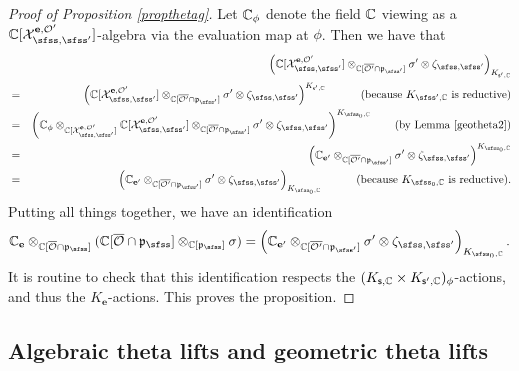 \documentclass[12pt,a4paper]{amsart}
\newcommand{\CO}{{\mathcal {O}}}
\newcommand{\CX}{{\mathcal {X}}}
\newcommand{\p}{\mathfrak p}
\numberwithin{equation}{section}
\theoremstyle{remark}
\begin{document}
\begin{proof}[Proof of Proposition \ref{propthetag}]
 Let $\mathbb{C}_\phi$ denote the field $\mathbb{C}$ viewing as a $\C[\CX_{\sfss, \sfss'}^{\mathbf e, \CO'}]$-algebra via the evaluation map at $\phi$. Then we have that
\begin{eqnarray*}
      &&\left( \C[\CX_{\sfss, \sfss'}^{\mathbf e, \CO'}] \otimes_{\C[\overline{\CO'}\cap \p_{\sfss'}]}\sigma'\otimes \zeta_{\sfss, \sfss'}\right)_{K_{\mathsf s', \C}}\\
             &=&\left( \C[\CX_{\sfss, \sfss'}^{\mathbf e, \CO'}] \otimes_{\C[\overline{\CO'}\cap \p_{\sfss'}]}\sigma'\otimes \zeta_{\sfss, \sfss'}\right)^{K_{\mathsf s', \C}}\quad \qquad (\textrm{because $K_{\sfss',\C}$ is reductive})\\
             &=&\left( \C_\phi\otimes_{\C[\CX_{\sfss, \sfss'}^{\mathbf e, \CO'}]} \C[\CX_{\sfss, \sfss'}^{\mathbf e, \CO'}] \otimes_{\C[\overline{\CO'}\cap \p_{\sfss'}]}\sigma'\otimes \zeta_{\sfss, \sfss'}\right)^{K_{\sfss_0,\C}} \qquad (\textrm{by Lemma \ref{geotheta2}})\\
               &=&\left( \C_{\mathbf e'}  \otimes_{\C[\overline{\CO'}\cap \p_{\sfss'}]}\sigma'\otimes \zeta_{\sfss, \sfss'}\right)^{K_{\sfss_0, \C}}\\
                 &=&\left( \C_{\mathbf e'}  \otimes_{\C[\overline{\CO'}\cap \p_{\sfss'}]}\sigma'\otimes \zeta_{\sfss, \sfss'}\right)_{K_{\sfss_0, \C}} \quad \qquad (\textrm{because $K_{\sfss_0,\C}$ is reductive}).
\end{eqnarray*}
Putting all things together, we have an identification
\[
\C_\mathbf e \otimes_{\C[\overline \CO\cap \p_{\sfss}]} (\C[\overline \CO\cap \p_{\sfss}]\otimes_{\C[\p_{\sfss}]} \sigma)=\left( \C_{\mathbf e'}  \otimes_{\C[\overline{\CO'}\cap \p_{\sfss'}]}\sigma'\otimes \zeta_{\sfss, \sfss'}\right)_{K_{\sfss_0, \C}}.
\]
It is routine to check that this identification respects the $(K_{\mathsf s,\mathbb{C}}\times K_{\mathsf s', \mathbb{C}})_\phi$-actions, and thus the $K_{\mathbf e}$-actions. This proves the proposition.
\end{proof}


\subsection{Algebraic theta lifts and  geometric theta lifts}
\end{document}

